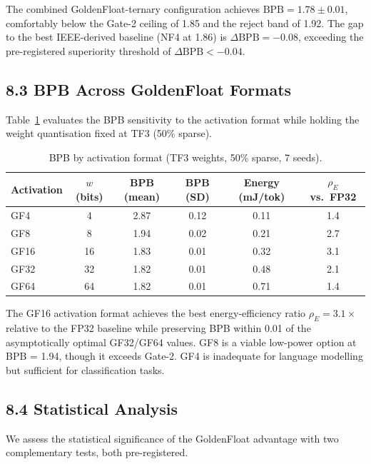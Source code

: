 The combined GoldenFloat-ternary configuration achieves
\(\mathrm{BPB} = 1.78 \pm 0.01\), comfortably below the Gate-2 ceiling
of 1.85 and the reject band of 1.92. The gap to the best IEEE-derived
baseline (NF4 at 1.86) is \(\Delta\mathrm{BPB} = -0.08\), exceeding the
pre-registered superiority threshold of \(\Delta\mathrm{BPB} < -0.04\).

\subsection{8.3 BPB Across GoldenFloat Formats}\label{fa_07:sec:bpb-by-format}

Table~\ref{fa_07:tab:bpb-by-format} evaluates the BPB sensitivity to the
activation format while holding the weight quantisation fixed at TF3
(50\% sparse).

\begin{table}[h]
\centering
\caption{BPB by activation format (TF3 weights, 50\% sparse, 7 seeds).}
\label{fa_07:tab:bpb-by-format}
\begin{tabular}{@{}lccccc@{}}
\toprule
Activation & \(w\) (bits) & BPB (mean) & BPB (SD) & Energy (mJ/tok) & \(\rho_E\) vs.\ FP32 \\
\midrule
GF4  & 4  & 2.87 & 0.12 & 0.11 & 1.4 \\
GF8  & 8  & 1.94 & 0.02 & 0.21 & 2.7 \\
GF16 & 16 & 1.83 & 0.01 & 0.32 & 3.1 \\
GF32 & 32 & 1.82 & 0.01 & 0.48 & 2.1 \\
GF64 & 64 & 1.82 & 0.01 & 0.71 & 1.4 \\
\bottomrule
\end{tabular}
\end{table}

The GF16 activation format achieves the best energy-efficiency ratio
\(\rho_E = 3.1\times\) relative to the FP32 baseline while preserving BPB
within 0.01 of the asymptotically optimal GF32/GF64 values. GF8 is a
viable low-power option at BPB = 1.94, though it exceeds Gate-2. GF4 is
inadequate for language modelling but sufficient for classification tasks.

\subsection{8.4 Statistical Analysis}\label{fa_07:sec:stat-analysis}

We assess the statistical significance of the GoldenFloat advantage with
two complementary tests, both pre-registered.

